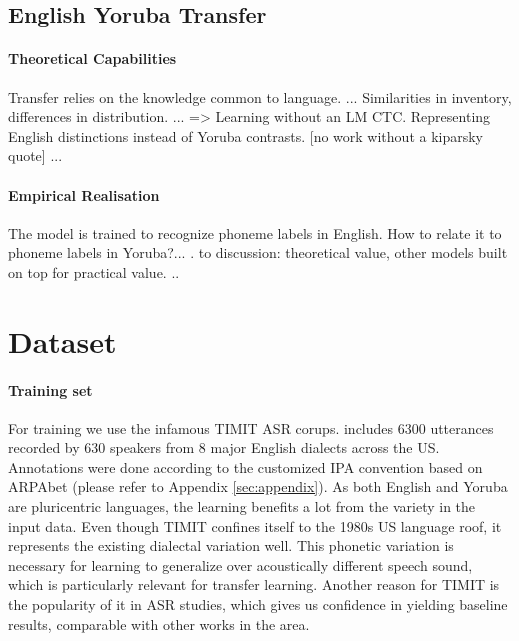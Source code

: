 \documentclass[11pt]{article}
\begin{document}
\subsection{English Yoruba Transfer}
\paragraph{Theoretical Capabilities} Transfer relies on the knowledge common to language. ... Similarities in inventory, differences in distribution. ... => Learning without an LM CTC. Representing English distinctions instead of Yoruba contrasts. [no work without a kiparsky quote] ... 
\paragraph{Empirical Realisation} The model is trained to recognize phoneme labels in English. How to relate it to phoneme labels in Yoruba?... . to discussion: theoretical value, other models built on top for practical value.   ..

\section{Dataset}
\paragraph{Training set} For training we use the infamous TIMIT ASR corups. \cite{garofolo1993timit} includes 6300 utterances recorded by 630 speakers from 8 major English dialects across the US. Annotations were done according to the customized IPA convention based on ARPAbet \cite{cmudict} (please refer to Appendix \ref{sec:appendix}). As both English and Yoruba are pluricentric languages, the learning benefits a lot from the variety in the input data. Even though TIMIT confines itself to the 1980s US language roof, it represents the existing dialectal variation well. This phonetic variation is necessary for learning to generalize over acoustically different speech sound, which is particularly relevant for transfer learning. Another reason for TIMIT is the popularity of it in ASR studies, which gives us confidence in yielding baseline results, comparable with other works in the area.
\end{document}
